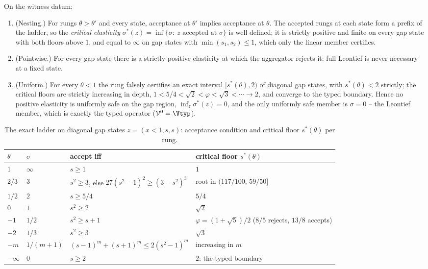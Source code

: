 \begin{theorem}\label{thm:ladder}
On the witness datum:
\begin{enumerate}[label=\textup{(\roman*)},leftmargin=2em]
\item \textup{(Nesting.)} For rungs $\theta>\theta'$ and every state, acceptance at $\theta'$ implies acceptance at $\theta$. The accepted rungs at each state form a prefix of the ladder, so the \emph{critical elasticity} $\sigma^*(z)=\inf\{\sigma:\ z\text{ accepted at }\sigma\}$ is well defined; it is strictly positive and finite on every gap state with both floors above $1$, and equal to $\infty$ on gap states with $\min(s_1,s_2)\le1$, which only the linear member certifies.
\item \textup{(Pointwise.)} For every gap state there is a strictly positive elasticity at which the aggregator rejects it: full Leontief is never necessary at a fixed state.
\item \textup{(Uniform.)} For every $\theta<1$ the rung falsely certifies an exact interval $[s^*(\theta),2)$ of diagonal gap states, with $s^*(\theta)<2$ strictly; the critical floors are strictly increasing in depth, $1<5/4<\sqrt2<\varphi<\sqrt3<\cdots\to2$, and converge to the typed boundary. Hence no positive elasticity is uniformly safe on the gap region, $\inf_z\sigma^*(z)=0$, and the only uniformly safe member is $\sigma=0$ -- the Leontief member, which is exactly the typed operator ($\mathcal V^{0}=\Vtyp$).
\end{enumerate}
\end{theorem}

\begin{table}[!htbp]
\centering\small
\caption{The exact ladder on diagonal gap states $z=(x<1,s,s)$: acceptance condition and critical floor $s^*(\theta)$ per rung.}
\label{tab:ladder}
\begin{tabularx}{\textwidth}{@{}ll>{\raggedright\arraybackslash}p{}X@{}}
\toprule
$\theta$ & $\sigma$ & accept iff & critical floor $s^*(\theta)$ \\
\midrule
$1$ & $\infty$ & $s\ge1$ & $1$ \\
$2/3$ & $3$ & $s^2\ge3$, else $27(s^2-1)^2\ge(3-s^2)^3$ & root in $(117/100,\,59/50]$ \\
$1/2$ & $2$ & $s\ge5/4$ & $5/4$ \\
$0$ & $1$ & $s^2\ge2$ & $\sqrt2$ \\
$-1$ & $1/2$ & $s^2\ge s+1$ & $\varphi=(1+\sqrt5)/2$ ($8/5$ rejects, $13/8$ accepts) \\
$-2$ & $1/3$ & $s^2\ge3$ & $\sqrt3$ \\
$-m$ & $1/(m+1)$ & $(s-1)^m+(s+1)^m\le2(s^2-1)^m$ & increasing in $m$ \\
$-\infty$ & $0$ & $s\ge2$ & $2$: the typed boundary \\
\bottomrule
\end{tabularx}
\end{table}


